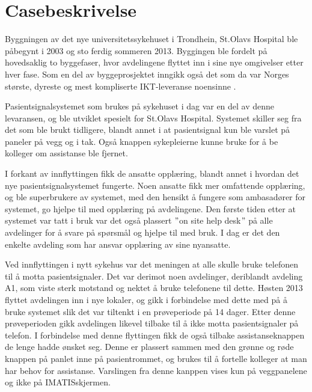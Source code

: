 \chapter{Casebeskrivelse}
\label{chp:case}
Byggningen av det nye universitetssykehuset i Trondhein, St.Olavs Hospital ble påbegynt i 2003 og sto ferdig sommeren 2013. Byggingen ble fordelt på hovedsaklig to byggefaser, hvor avdelingene flyttet inn i sine nye omgivelser etter hver fase. Som en del av byggeprosjektet inngikk også det som da var Norges største, dyreste og mest kompliserte IKT-leveranse noensinne \citep{TU}. 

\noindent
Pasientsignalsystemet som brukes på sykehuset i dag var en del av denne levaransen, og ble utviklet spesielt for St.Olavs Hospital. Systemet skiller seg fra det som ble brukt tidligere, blandt annet i at pasientsignal kun ble varslet på paneler på vegg og i tak. Også knappen sykepleierne kunne bruke for å be kolleger om assistanse ble fjernet.

\noindent
I forkant av innflyttingen fikk de ansatte opplæring, blandt annet i hvordan det nye pasientsignalsystemet fungerte. Noen ansatte fikk mer omfattende opplæring, og ble superbrukere av systemet, med den hensikt å fungere som ambasadører for systemet, go hjelpe til med opplæring på avdelingene. Den første tiden etter at systemet var tatt i bruk var det også plassert $"$on site help desk$"$ på alle avdelinger for å svare på spørsmål og hjelpe til med bruk. I dag er det den enkelte avdeling som har ansvar opplæring av sine nyansatte. 

\noindent
Ved innflyttingen i nytt sykehus var det meningen at alle skulle bruke telefonen til å motta pasientsignaler. Det var derimot noen avdelinger, deriblandt avdeling A1, som viste sterk motstand og nektet å bruke telefonene til dette.
Høsten 2013 flyttet avdelingen inn i nye lokaler, og gikk i forbindelse med dette med på å bruke systemet slik det var tiltenkt i en prøveperiode på 14 dager. Etter denne prøveperioden gikk avdelingen likevel tilbake til å ikke motta pasientsignaler på telefon. 
I forbindelse med denne flyttingen fikk de også tilbake assistanseknappen de lenge hadde ønsket seg. Denne er plassert sammen med den grønne og røde knappen på panlet inne på pasientrommet, og brukes til å fortelle kolleger at man har behov for assistanse. Varslingen fra denne kanppen vises kun på veggpanelene og ikke på IMATISskjermen.

